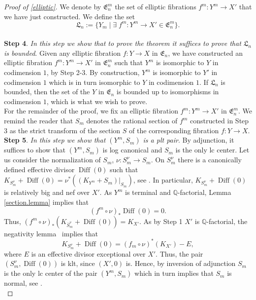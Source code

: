 \documentclass{amsart}[12pt,a4paper]
\theoremstyle{definition}
\DeclareMathOperator{\diff}{\mathrm{Diff}}
\begin{document}
\begin{proof}[Proof of \ref{elliptic}]
We denote by $\mathfrak{E}^m_n$ the set of elliptic fibrations $f^m \colon Y^m \to X'$ that we have just constructed.
We define the set 
\[
\mathfrak{L}_n :=\{ Y_m \; | \; \exists \; f^m \colon Y^m \to X' \in \mathfrak{E}^m_n \}.
\] 
\\

{\bf Step 4}. {\it In this step we show that to prove the theorem it suffices to prove that $\mathfrak{L}_n$ is bounded}.
\newline
Given any elliptic fibration $f \colon Y \to X$ in $\mathfrak{E}_n$, we have constructed an elliptic fibration $f^m \colon Y^m \to X'$ in $\mathfrak{E}^m_n$ such that $Y^m$ is isomorphic to $Y$ in codimension $1$, by Step 2-3.
By construction, $Y^m$ is isomorphic to $Y'$ in codimension $1$ which is in turn isomorphic to $Y$ in codimension $1$.
If $\mathfrak{L}_n$ is bounded, then the set of the $Y$ in $\mathfrak{E}_n$ is bounded up to isomorphisms in codimension $1$, which is what we wish to prove.\\

\noindent
For the remainder of the proof, we fix an elliptic fibration $f^m \colon Y^m \to X'$ in $\mathfrak{E}^m_n$.
We remind the reader that $S_m$ denotes the rational section of $f^m$ constructed in Step 3 as the strict transform of the section $S$ of the corresponding fibration $f \colon Y \to X$.\\

{\bf Step 5}. {\it In this step we show that $(Y^m, S_m)$ is a plt pair}.
\newline 
By adjunction, it suffices to show that $(Y^m, S_m)$ is log canonical and $S_m$ is the only lc center.
Let us consider the normalization of $S_m$, $\nu \colon S_m^\nu \to S_m$. 
On $S_m^\nu$ there is a canonically defined effective divisor $\diff(0)$ such that $K_{S_m^\nu}+\diff(0)=\nu^\ast((K_{Y^m}+S_m)|_{S_m})$, see \cite[\S~4.1]{Kol13}. 
In particular, $K_{S_m^\nu}+\diff(0)$ is relatively big and nef over $X'$.
As $Y^m$ is terminal and $\mathbb{Q}$-factorial, Lemma \ref{section.lemma} implies that
\begin{equation}
\label{exc.diff.eqn}
(f^m \circ \nu)_\ast \diff(0)=0.
\end{equation}
Thus, $(f^m \circ \nu)_\ast (K_{\bar{S}_m^\nu} + \diff(0))=K_{X'}$.
As by Step 1 $X'$ is $\mathbb{Q}$-factorial, the negativity lemma~\cite[Lemma 3.39]{KM} implies that 
\[
K_{S_m^\nu}+\diff(0)=(f_m \circ \nu)^\ast(K_{X'}) -E,
\]
where $E$ is an effective divisor exceptional over $X'$.
Thus, the pair $(S_m^\nu, \diff(0))$ is klt, since $(X', 0)$ is. 
Hence, by inversion of adjunction \cite[Theorem~5.50]{KM} $S_m$ is the only lc center of the pair $(Y^m, S_m)$ which in turn implies that $S_m$ is normal, see \cite[Proposition 5.51]{KM}.\\
    

\end{proof}
\end{document}
